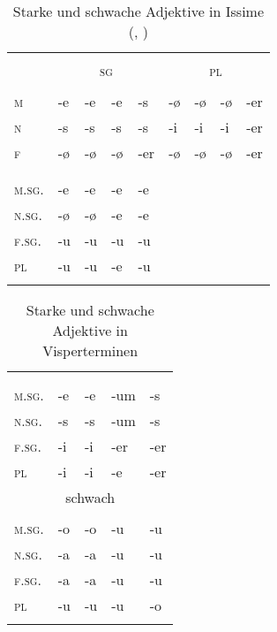 
\begin{table}[H]
	\caption{Starke und schwache Adjektive in Issime (\citealt[267-268]{Zürrer1999}, \citealt[90-97]{Perinetto1981})}\label{table24}
	\begin{tabular}{>{\scshape}lllllllll}
		\lsptoprule
		\multicolumn{9}{c}{{stark}} \\
		& \multicolumn{4}{c}{\textsc{sg}} &  \multicolumn{4}{c}{\textsc{pl}} \\\cmidrule(lr){2-5}\cmidrule(lr){6-9}
		& \NOM & \AKK & \DAT & \GEN & \NOM & \AKK & \DAT & \GEN\\\midrule
		m & {}-e & {}-e & {}-e & {}-s & {}-ø & {}-ø & {}-ø & {}-er\\
		n & {}-s & {}-s & {}-s & {}-s & {}-i & {}-i & {}-i & {}-er\\
		f & {}-ø & {}-ø & {}-ø & {}-er & {}-ø & {}-ø & {}-ø & {}-er\\\midrule
		\multicolumn{9}{c}{{schwach}} \\		
		& \NOM & \AKK & \DAT & \GEN &  &  &  & \\\midrule
		\textsc{m.sg.} & {}-e & {}-e & {}-e & {}-e &  &  &  & \\
		\textsc{n.sg.} & {}-ø & {}-ø & {}-e & {}-e &  &  &  & \\
		\textsc{f.sg.} & {}-u & {}-u & {}-u & {}-u &  &  &  & \\
		\textsc{pl} & {}-u & {}-u & {}-e & {}-u &  &  &  & \\
		\lspbottomrule
	\end{tabular}
\end{table}


\begin{table}[H]
	\caption{Starke und schwache Adjektive in Visperterminen \citep[134-135]{Wipf1911}}\label{table25}
	\begin{tabular}{lllll}
		\lsptoprule
		\multicolumn{5}{c}{stark}\\
		& \NOM & \AKK & \DAT & \GEN\\\midrule
		\textsc{m.sg.} & {}-e & {}-e & {}-um & {}-s\\
		\textsc{n.sg.} & {}-s & {}-s & {}-um & {}-s\\
		\textsc{f.sg.} & {}-i & {}-i & {}-er & {}-er\\
		\textsc{pl} & {}-i & {}-i & {}-e & {}-er\\\midrule 		
		\multicolumn{5}{c}{schwach}\\
		& \NOM & \AKK & \DAT & \GEN\\\midrule
		\textsc{m.sg.} & {}-o & {}-o & {}-u & {}-u\\
		\textsc{n.sg.} & {}-a & {}-a & {}-u & {}-u\\
		\textsc{f.sg.} & {}-a & {}-a & {}-u & {}-u\\
		\textsc{pl} & {}-u & {}-u & {}-u & {}-o\\
		\lspbottomrule
	\end{tabular}
\end{table}

